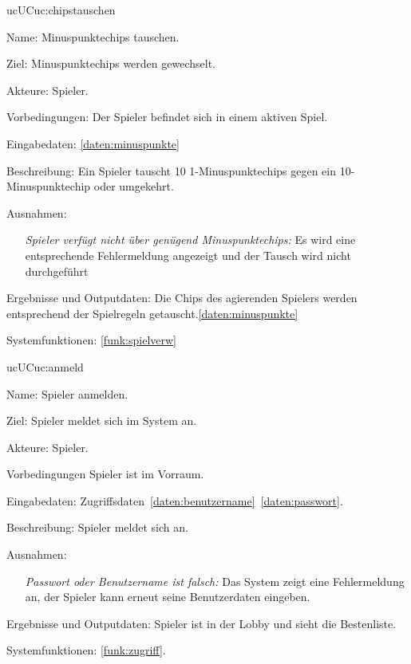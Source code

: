 \begin{description}[leftmargin=5em, style=sameline]
			\begin{lhp}{uc}{UC}{uc:chipstauschen}
		\item [Name:]Minuspunktechips tauschen.
		\item [Ziel:]Minuspunktechips werden gewechselt.
		\item [Akteure:]Spieler.
		\item [Vorbedingungen:]Der Spieler befindet sich in einem aktiven Spiel.
		\item [Eingabedaten:]\ref{daten:minuspunkte}
		\item [Beschreibung:]Ein Spieler tauscht 10 1-Minuspunktechips gegen ein 10-Minuspunktechip oder umgekehrt.
		\item [Ausnahmen:]\hfill
		\begin{itemize}
		    \item[]
		    \textit{Spieler verfügt nicht über genügend Minuspunktechips: }Es wird eine entsprechende Fehlermeldung angezeigt und der Tausch wird nicht durchgeführt
		\end{itemize}
		\item [Ergebnisse und Outputdaten:]Die Chips des agierenden Spielers werden entsprechend der Spielregeln getauscht.\ref{daten:minuspunkte}
		\item [Systemfunktionen:]
		\ref{funk:spielverw}
	\end{lhp}
	
	\begin{lhp}{uc}{UC}{uc:anmeld}
		\item [Name:] Spieler anmelden.
		\item [Ziel:] Spieler meldet sich im System an.
		\item [Akteure:] Spieler.
		\item [Vorbedingungen] Spieler ist im Vorraum.
		\item [Eingabedaten:] Zugriffsdaten~\ref{daten:benutzername}~\ref{daten:passwort}.
		\item [Beschreibung:] Spieler meldet sich an.							
		\item [Ausnahmen:] \hfill
			\begin{itemize} 
				\item[] \textit{Passwort oder Benutzername ist falsch:} Das System zeigt eine Fehlermeldung an, der Spieler kann erneut seine Benutzerdaten eingeben.
				
			\end{itemize}
		\item [Ergebnisse und Outputdaten:] Spieler ist in der Lobby und sieht die Bestenliste.	
		\item [Systemfunktionen:] \ref{funk:zugriff}.
	\end{lhp}
	

\end{description}
